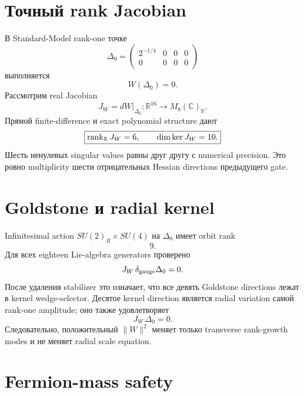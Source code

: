 \section{Точный rank Jacobian}

В Standard-Model rank-one точке
\begin{equation}
 \Delta_0=
 \begin{pmatrix}2^{-1/4}&0&0&0\\0&0&0&0\end{pmatrix}
\end{equation}
выполняется
\begin{equation}
 W(\Delta_0)=0.
\end{equation}
Рассмотрим real Jacobian
\begin{equation}
 J_W=dW|_{\Delta_0}:
 \mathbb R^{16}\longrightarrow M_8(\mathbb C)_\mathbb R.
\end{equation}
Прямой finite-difference и exact polynomial structure дают
\begin{equation}
 \boxed{\operatorname{rank}_\mathbb R J_W=6,\qquad\dim\ker J_W=10.}
 \label{eq:ps-wedge-jacobian-rank}
\end{equation}
Шесть ненулевых singular values равны друг другу с numerical precision.
Это ровно multiplicity шести отрицательных Hessian directions предыдущего
gate.

\section{Goldstone и radial kernel}

Infinitesimal action \(SU(2)_R\times SU(4)\) на \(\Delta_0\) имеет orbit
rank
\begin{equation}
 \boxed{9.}
\end{equation}
Для всех eighteen Lie-algebra generators проверено
\begin{equation}
 J_W\,\delta_{\rm gauge}\Delta_0=0.
\end{equation}
После удаления stabilizer это означает, что все девять Goldstone directions
лежат в kernel wedge-selector. Десятое kernel direction является radial
variation самой rank-one amplitude; оно также удовлетворяет
\begin{equation}
 J_W\,\Delta_0=0.
\end{equation}
Следовательно, положительный \(\|W\|^2\) меняет только transverse rank-growth
modes и не меняет radial scale equation.

\section{Fermion-mass safety}

